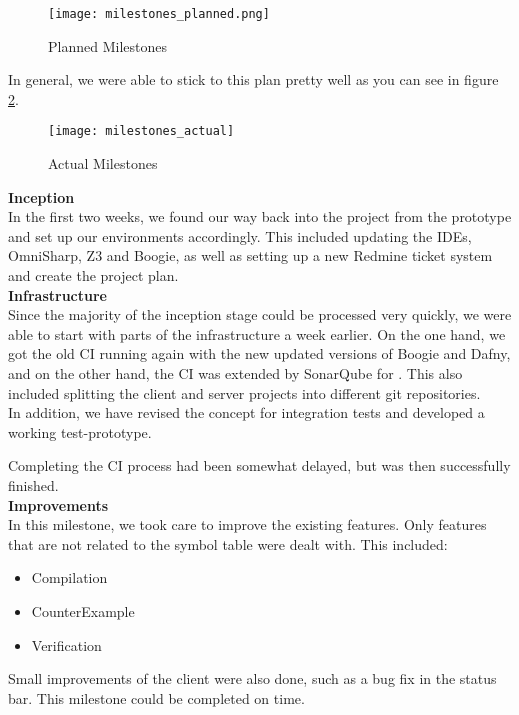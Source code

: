 \begin{figure}[H]
    \centering
    \texttt{[image: milestones\_planned.png]}
    \caption{Planned Milestones}
    \label{fig:planned_milestones}
\end{figure}

In general, we were able to stick to this plan pretty well as you can see in figure \ref{fig:actual_milestones}.

\begin{figure}[H]
    \centering
    \texttt{[image: milestones\_actual]}
    \caption{Actual Milestones}
    \label{fig:actual_milestones}
\end{figure}

{\bf Inception}\\
In the first two weeks, we found our way back into the project from the prototype
and set up our environments accordingly.
This included updating the IDEs, OmniSharp, Z3 and Boogie,
as well as setting up a new Redmine ticket system and create the project plan.\\

{\bf Infrastructure}\\
Since the majority of the inception stage could be processed very quickly,
we were able to start with parts of the infrastructure a week earlier.
On the one hand, we got the old CI running again with the new updated versions of Boogie and Dafny,
and on the other hand, the CI was extended by SonarQube for \Csharp.
This also included splitting the client and server projects into different git repositories.\\

In addition, we have revised the concept for integration tests and developed
a working test-prototype.

Completing the CI process had been somewhat delayed, but was then successfully finished.\\

{\bf Improvements}\\
In this milestone, we took care to improve the existing features.
Only features that are not related to the symbol table were dealt with.
This included:
\begin{itemize}
    \item Compilation
    \item CounterExample
    \item Verification
\end{itemize}

Small improvements of the client were also done, such as a bug fix in the status bar.
This milestone could be completed on time.\\

